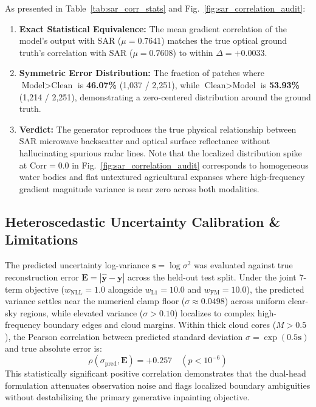 As presented in Table~\ref{tab:sar_corr_stats} and Fig.~\ref{fig:sar_correlation_audit}:
\begin{enumerate}
    \item \textbf{Exact Statistical Equivalence:} The mean gradient correlation of the model's output with SAR ($\mu = 0.7641$) matches the true optical ground truth's correlation with SAR ($\mu = 0.7608$) to within \textbf{$\Delta = +0.0033$}.
    \item \textbf{Symmetric Error Distribution:} The fraction of patches where $\text{Model} > \text{Clean}$ is \textbf{46.07\%} (1,037 / 2,251), while $\text{Clean} > \text{Model}$ is \textbf{53.93\%} (1,214 / 2,251), demonstrating a zero-centered distribution around the ground truth.
    \item \textbf{Verdict:} The generator reproduces the true physical relationship between SAR microwave backscatter and optical surface reflectance without hallucinating spurious radar lines. Note that the localized distribution spike at $\text{Corr} = 0.0$ in Fig.~\ref{fig:sar_correlation_audit} corresponds to homogeneous water bodies and flat untextured agricultural expanses where high-frequency gradient magnitude variance is near zero across both modalities.
\end{enumerate}

\subsection{Heteroscedastic Uncertainty Calibration \& Limitations}
The predicted uncertainty log-variance $\mathbf{s} = \log \sigma^2$ was evaluated against true reconstruction error $\mathbf{E} = |\hat{\mathbf{y}} - \mathbf{y}|$ across the held-out test split. Under the joint 7-term objective ($w_{\text{NLL}} = 1.0$ alongside $w_{\text{L1}} = 10.0$ and $w_{\text{FM}} = 10.0$), the predicted variance settles near the numerical clamp floor ($\sigma \approx 0.0498$) across uniform clear-sky regions, while elevated variance ($\sigma > 0.10$) localizes to complex high-frequency boundary edges and cloud margins. Within thick cloud cores ($M > 0.5$), the Pearson correlation between predicted standard deviation $\sigma = \exp(0.5\mathbf{s})$ and true absolute error is:
\begin{equation}
    \rho(\sigma_{\text{pred}}, \mathbf{E}) = +0.257 \quad (p < 10^{-6})
\end{equation}
This statistically significant positive correlation demonstrates that the dual-head formulation attenuates observation noise and flags localized boundary ambiguities without destabilizing the primary generative inpainting objective.


